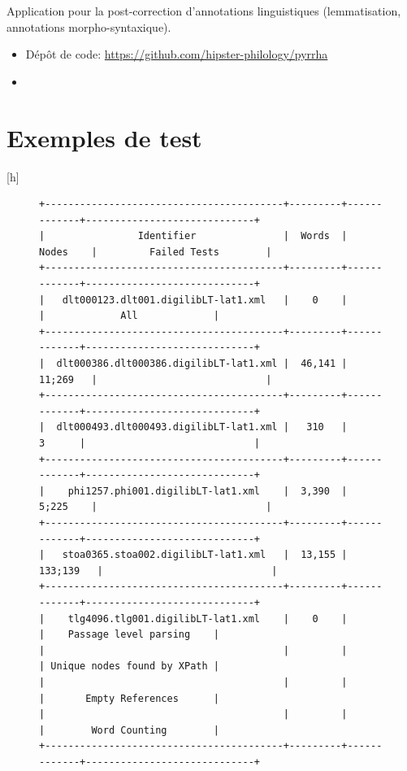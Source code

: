 Application pour la post-correction d'annotations linguistiques (lemmatisation, annotations morpho-syntaxique).

\begin{itemize}
    \item Dépôt de code: \url{https://github.com/hipster-philology/pyrrha}
    \item \cite{Clerice_Pyrrha_2021}
\end{itemize}

\section*{Exemples de test}[h]

\begin{figure}
\centering
\begin{adjustbox}{width=.9\linewidth}
\begin{lstlisting}[breaklines=false,columns=fullflexible,keepspaces]
+-----------------------------------------+---------+-------------+-----------------------------+
|                Identifier               |  Words  |    Nodes    |         Failed Tests        |
+-----------------------------------------+---------+-------------+-----------------------------+
|   dlt000123.dlt001.digilibLT-lat1.xml   |    0    |             |             All             |
+-----------------------------------------+---------+-------------+-----------------------------+
|  dlt000386.dlt000386.digilibLT-lat1.xml |  46,141 |    11;269   |                             |
+-----------------------------------------+---------+-------------+-----------------------------+
|  dlt000493.dlt000493.digilibLT-lat1.xml |   310   |      3      |                             |
+-----------------------------------------+---------+-------------+-----------------------------+
|    phi1257.phi001.digilibLT-lat1.xml    |  3,390  |    5;225    |                             |
+-----------------------------------------+---------+-------------+-----------------------------+
|   stoa0365.stoa002.digilibLT-lat1.xml   |  13,155 |   133;139   |                             |
+-----------------------------------------+---------+-------------+-----------------------------+
|    tlg4096.tlg001.digilibLT-lat1.xml    |    0    |             |    Passage level parsing    |
|                                         |         |             | Unique nodes found by XPath |
|                                         |         |             |       Empty References      |
|                                         |         |             |        Word Counting        |
+-----------------------------------------+---------+-------------+-----------------------------+


\end{lstlisting}
\end{adjustbox}
\end{figure}
